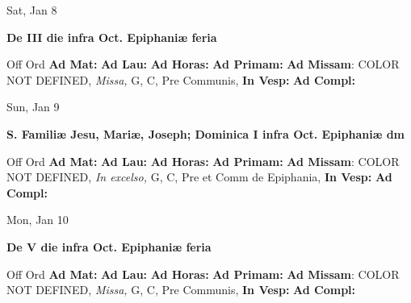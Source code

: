 \documentclass[10pt]{memoir}
\begin{document}
\begin{center}
\begin{minipage}{3.5in}
\vspace{2em}
\begin{center}Sat, Jan 8
\end{center}
\textbf{ \large De III die infra Oct. Epiphaniæ
\textnormal{\normalsize feria}}

\begin{justify}Off Ord
\textbf{Ad Mat: }
\textbf{Ad Lau: }
\textbf{Ad Horas: }
\textbf{Ad Primam: }\textbf{Ad Missam}: COLOR NOT DEFINED, \textit{Missa,} G, C, Pre Communis, 
\textbf{In Vesp: }
\textbf{Ad Compl: }
\end{justify}
\end{minipage}
\end{center}

\begin{center}
\begin{minipage}{3.5in}
\vspace{2em}
\begin{center}Sun, Jan 9
\end{center}
\textbf{ \large S. Familiæ Jesu, Mariæ, Joseph; Dominica I infra Oct. Epiphaniæ
\textnormal{\normalsize dm}}

\begin{justify}Off Ord
\textbf{Ad Mat: }
\textbf{Ad Lau: }
\textbf{Ad Horas: }
\textbf{Ad Primam: }\textbf{Ad Missam}: COLOR NOT DEFINED, \textit{In excelso,} G, C, Pre et Comm de Epiphania, 
\textbf{In Vesp: }
\textbf{Ad Compl: }
\end{justify}
\end{minipage}
\end{center}

\begin{center}
\begin{minipage}{3.5in}
\vspace{2em}
\begin{center}Mon, Jan 10
\end{center}
\textbf{ \large De V die infra Oct. Epiphaniæ
\textnormal{\normalsize feria}}

\begin{justify}Off Ord
\textbf{Ad Mat: }
\textbf{Ad Lau: }
\textbf{Ad Horas: }
\textbf{Ad Primam: }\textbf{Ad Missam}: COLOR NOT DEFINED, \textit{Missa,} G, C, Pre Communis, 
\textbf{In Vesp: }
\textbf{Ad Compl: }
\end{justify}
\end{minipage}
\end{center}
\end{document}
